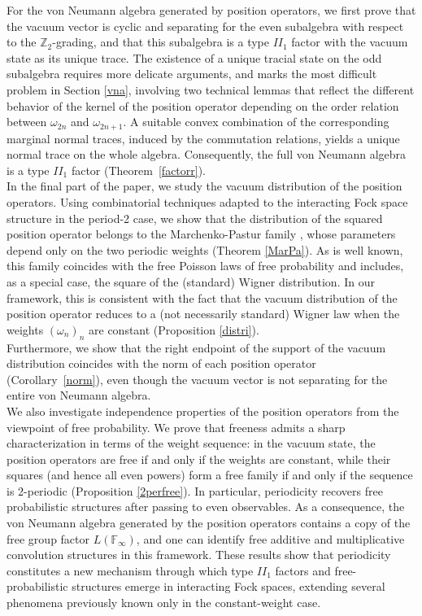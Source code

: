 \documentclass[12pt]{amsart}
\numberwithin{equation}{section}
\theoremstyle{definition}
\begin{document}
For the von Neumann algebra generated by position operators, we first prove that the vacuum vector is cyclic and separating for the even subalgebra with respect to the $\mathbb{Z}_2$-grading, and that this subalgebra is a type $II_1$ factor with the vacuum state as its unique trace. The existence of a unique tracial state on the odd subalgebra requires more delicate arguments, and marks the most difficult problem in Section \ref{vna}, involving two technical lemmas that reflect the different behavior of the kernel of the position operator depending on the order relation between $\omega_{2n}$ and $\omega_{2n+1}$. A suitable convex combination of the corresponding marginal normal traces, induced by the commutation relations, yields a unique normal trace on the whole algebra. Consequently, the full von Neumann algebra is a type $II_1$ factor (Theorem~\ref{factorr}).\\
In the final part of the paper, we study the vacuum distribution of the position operators. Using combinatorial techniques adapted to the interacting Fock space structure in the period-2 case, we show that the distribution of the squared position operator belongs to the Marchenko-Pastur family \cite{MP}, whose parameters depend only on the two periodic weights (Theorem \ref{MarPa}). As is well known, this family coincides with the free Poisson laws of free probability \cite{NS} and includes, as a special case, the square of the (standard) Wigner distribution. In our framework, this is consistent with the fact that the vacuum distribution of the position operator reduces to a (not necessarily standard) Wigner law when the weights $(\omega_n)_n$ are constant (Proposition \ref{distri}).\\
Furthermore, we show that the right endpoint of the support of the vacuum distribution coincides with the norm of each position operator (Corollary~\ref{norm}), even though the vacuum vector is not separating for the entire von Neumann algebra. \\
We also investigate independence properties of the position operators from the viewpoint of free probability. We prove that freeness admits a sharp characterization in terms of the weight sequence: in the vacuum state, the position operators are free if and only if the weights are constant, while their squares (and hence all even powers) form a free family if and only if the sequence is 2-periodic (Proposition \ref{2perfree}). In particular, periodicity recovers free probabilistic structures after passing to even observables. As a consequence, the von Neumann algebra generated by the position operators contains a copy of the free group factor $L(\mathbb{F}_\infty)$, and one can identify free additive and multiplicative convolution structures in this framework.
These results show that periodicity constitutes a new mechanism through which type $II_1$ factors and free-probabilistic structures emerge in interacting Fock spaces, extending several phenomena previously known only in the constant-weight case.
\end{document}
